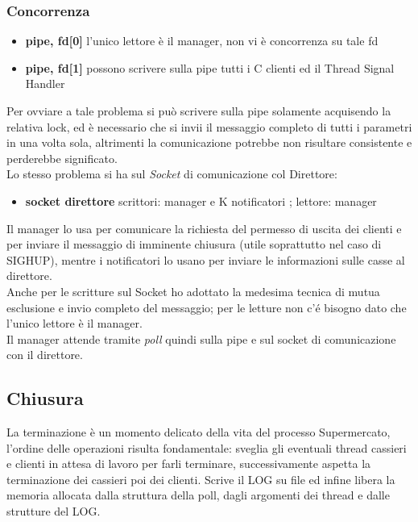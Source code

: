 \documentclass[11pt, a4paper]{article}
\begin{document}
\subsubsection{Concorrenza}
\begin{itemize}
\item \textbf{pipe, fd[0]} l'unico lettore è il manager, non vi è concorrenza su tale fd
\item \textbf{pipe, fd[1]} possono scrivere sulla pipe tutti i C clienti ed il Thread Signal Handler
\end{itemize}
Per ovviare a tale problema si può scrivere sulla pipe solamente acquisendo la relativa lock, ed è necessario che si invii il messaggio completo di tutti i parametri in una volta sola, altrimenti la comunicazione potrebbe non risultare consistente e perderebbe significato.\\
Lo stesso problema si ha sul \textit{Socket} di comunicazione col Direttore:
\begin{itemize}
\item \textbf{socket direttore} scrittori: manager e K notificatori ; lettore: manager
\end{itemize}
Il manager lo usa per comunicare la richiesta del permesso di uscita dei clienti e per inviare il messaggio di imminente chiusura (utile soprattutto nel caso di SIGHUP), mentre i notificatori lo usano per inviare le informazioni sulle casse al direttore.\\
Anche per le scritture sul Socket ho adottato la medesima tecnica di mutua esclusione e invio completo del 
messaggio; per le letture non c'é bisogno dato che l'unico lettore è il manager.\\
Il manager attende tramite \textit{poll} quindi sulla pipe e sul socket di comunicazione con il direttore.
\subsection{Chiusura}
La terminazione è un momento delicato della vita del processo Supermercato, l'ordine delle operazioni risulta fondamentale: sveglia gli eventuali thread cassieri e clienti in attesa di lavoro per farli terminare, successivamente aspetta la terminazione dei cassieri poi dei clienti. Scrive il LOG su file ed
infine libera la memoria allocata dalla struttura della poll, dagli argomenti dei thread e dalle strutture del LOG.
\end{document}
